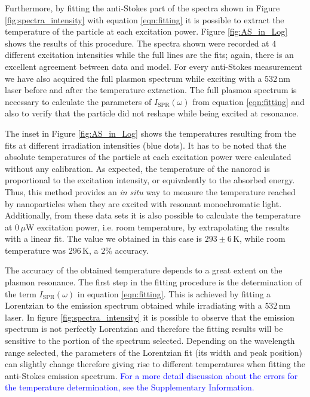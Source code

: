 \documentclass[journal=nalefd,manuscript=letter]{achemso}
\newcommand{\HI}[1]{\textcolor{blue}{#1}} %
\newcommand{\K}{\ensuremath{\,\textrm{K}}}
\newcommand{\nm}{\ensuremath{\,\textrm{nm}}}
\newcommand{\uW}{\ensuremath{\,\mu\textrm{W}}}
\begin{document}
Furthermore, by fitting the anti-Stokes part of the spectra shown in Figure
\ref{fig:spectra_intensity} with equation \ref{eqn:fitting} it is possible to extract
the temperature of the particle at each excitation power. Figure
\ref{fig:AS_in_Log} shows the results of this procedure. The spectra shown were
recorded at $4$ different excitation intensities while the full lines are the
fits; again, there is an excellent agreement between data and model. For every
anti-Stokes measurement we have also acquired the full plasmon spectrum while
exciting with a $532\nm$ laser before and after the temperature extraction.
The full plasmon spectrum is necessary to calculate the parameters of
$I_\textrm{SPR}(\omega)$ from equation \ref{eqn:fitting} and also to verify that the
particle did not reshape while being excited at resonance. 

The inset in Figure \ref{fig:AS_in_Log} shows the temperatures resulting from
the fits at different irradiation intensities (blue dots). It has to be noted
that the absolute temperatures of the particle at each excitation power were
calculated without any calibration. As expected, the temperature of the nanorod
is proportional to the excitation intensity, or equivalently to the absorbed
energy. Thus, this method provides an \textit{in situ} way to measure the
temperature reached by nanoparticles when they are excited with resonant
monochromatic light. Additionally, from these data sets it  is also possible to
calculate the temperature at $0\uW$ excitation power, i.e. room temperature, by
extrapolating the results with a linear fit. The value we obtained in this case
is $293\pm 6 \K$, while room temperature was $296\K$, a $2\%$ accuracy.

The accuracy of the obtained temperature depends to a great extent on the
plasmon resonance. The first step in the fitting procedure is the determination
of the term $I_\textrm{SPR}(\omega)$ in equation \ref{eqn:fitting}. This is achieved by
fitting a Lorentzian to the emission spectrum obtained while irradiating with a
$532\nm$ laser. In figure \ref{fig:spectra_intensity} it is possible to observe
that the emission spectrum is not perfectly Lorentzian and therefore the fitting
results will be sensitive to the portion of the spectrum selected. Depending on
the wavelength range selected, the parameters of the Lorentzian fit (its width
and peak position) can slightly change therefore giving rise to different
temperatures when fitting the anti-Stokes emission spectrum. \HI{For a more detail 
discussion about the errors for the temperature determination, see the Supplementary Information.} 
\end{document}
